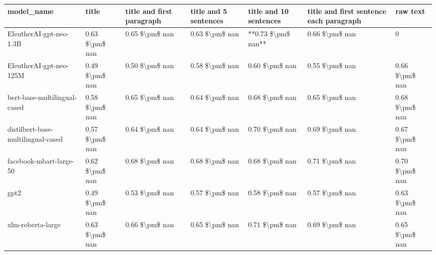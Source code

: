 \begin{tabular}{lllllll}
\toprule
                        model\_name &          title & title and first paragraph & title and 5 sentences & title and 10 sentences & title and first sentence each paragraph &       raw text \\
\midrule
           EleutherAI-gpt-neo-1.3B & 0.63 \$\textbackslash pm\$ nan &            0.65 \$\textbackslash pm\$ nan &        0.63 \$\textbackslash pm\$ nan &     **0.73 \$\textbackslash pm\$ nan** &                          0.66 \$\textbackslash pm\$ nan &              0 \\
           EleutherAI-gpt-neo-125M & 0.49 \$\textbackslash pm\$ nan &            0.50 \$\textbackslash pm\$ nan &        0.58 \$\textbackslash pm\$ nan &         0.60 \$\textbackslash pm\$ nan &                          0.55 \$\textbackslash pm\$ nan & 0.66 \$\textbackslash pm\$ nan \\
      bert-base-multilingual-cased & 0.58 \$\textbackslash pm\$ nan &            0.65 \$\textbackslash pm\$ nan &        0.64 \$\textbackslash pm\$ nan &         0.68 \$\textbackslash pm\$ nan &                          0.65 \$\textbackslash pm\$ nan & 0.68 \$\textbackslash pm\$ nan \\
distilbert-base-multilingual-cased & 0.57 \$\textbackslash pm\$ nan &            0.64 \$\textbackslash pm\$ nan &        0.64 \$\textbackslash pm\$ nan &         0.70 \$\textbackslash pm\$ nan &                          0.69 \$\textbackslash pm\$ nan & 0.67 \$\textbackslash pm\$ nan \\
           facebook-mbart-large-50 & 0.62 \$\textbackslash pm\$ nan &            0.68 \$\textbackslash pm\$ nan &        0.68 \$\textbackslash pm\$ nan &         0.68 \$\textbackslash pm\$ nan &                          0.71 \$\textbackslash pm\$ nan & 0.70 \$\textbackslash pm\$ nan \\
                              gpt2 & 0.49 \$\textbackslash pm\$ nan &            0.53 \$\textbackslash pm\$ nan &        0.57 \$\textbackslash pm\$ nan &         0.58 \$\textbackslash pm\$ nan &                          0.57 \$\textbackslash pm\$ nan & 0.63 \$\textbackslash pm\$ nan \\
                 xlm-roberta-large & 0.63 \$\textbackslash pm\$ nan &            0.66 \$\textbackslash pm\$ nan &        0.65 \$\textbackslash pm\$ nan &         0.71 \$\textbackslash pm\$ nan &                          0.69 \$\textbackslash pm\$ nan & 0.65 \$\textbackslash pm\$ nan \\
\bottomrule
\end{tabular}
